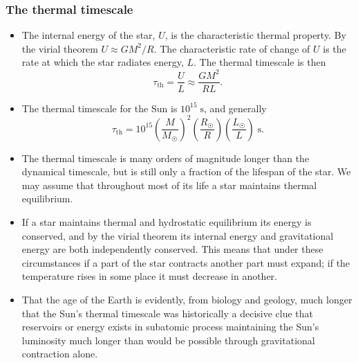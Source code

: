 \documentclass[10pt,amsmath,amssymb,aps,pra]{revtex4-2}
\newcommand{\unit}[1]{\;\mathrm{#1}}
\newcommand{\sub}[1]{_{\text{#1}}}
\newcommand{\rsun}{R_{\astrosun}}
\newcommand{\msun}{M_{\astrosun}}
\newcommand{\lsun}{L_{\astrosun}}
\begin{document}
\subsubsection*{The thermal timescale}
\begin{itemize}
\item The internal energy of the star, $U$, is the characteristic thermal
property. By the virial theorem $U\approx{G}M^2/R$. The characteristic rate of
change of $U$ is the rate at which the star radiates energy, $L$. The thermal
timescale is then
\begin{equation}
\tau\sub{th} = \frac{U}{L} \approx \frac{GM^2}{RL}.
\end{equation}

\item The thermal timescale for the Sun is $10^{15}\unit{s}$, and generally
\begin{equation}
\tau\sub{th} =
10^{15}\left(\frac{M}{\msun}\right)^2\left(\frac{\rsun}{R}\right)
\left(\frac{\lsun}{L}\right)\unit{s}.
\end{equation}

\item The thermal timescale is many orders of magnitude longer than the
dynamical timescale, but is still only a fraction of the lifespan of the star.
We may assume that throughout most of its life a star maintains thermal
equilibrium.

\item If a star maintains thermal and hydrostatic equilibrium its energy is
conserved, and by the virial theorem its internal energy and gravitational
energy are both independently conserved. This means that under these
circumstances if a part of the star contracts another part must expand; if the
temperature rises in some place it must decrease in another.

\item That the age of the Earth is evidently, from biology and geology, much
longer that the Sun's thermal timescale was historically a decisive clue that
reservoirs or energy exists in subatomic process maintaining the Sun's
luminosity much longer than would be possible through gravitational contraction
alone.
\end{itemize}
\end{document}
